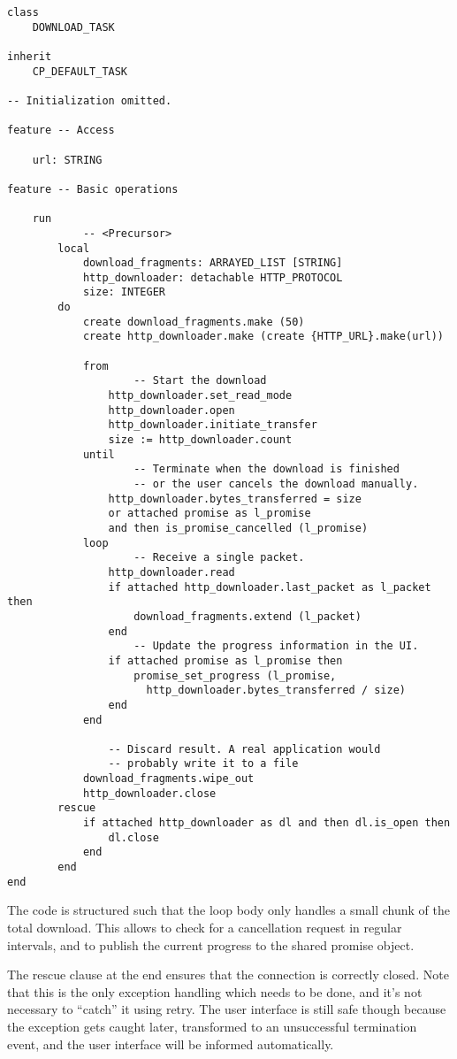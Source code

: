\begin{lstlisting}[language=OOSC2Eiffel, label={code:download-task}, captionpos=b, caption={The background download task.}]
class
	DOWNLOAD_TASK

inherit
	CP_DEFAULT_TASK

-- Initialization omitted.

feature -- Access

	url: STRING

feature -- Basic operations

	run
			-- <Precursor>
		local
			download_fragments: ARRAYED_LIST [STRING]
			http_downloader: detachable HTTP_PROTOCOL
			size: INTEGER
		do
			create download_fragments.make (50)
			create http_downloader.make (create {HTTP_URL}.make(url))

			from
					-- Start the download
				http_downloader.set_read_mode
				http_downloader.open
				http_downloader.initiate_transfer
				size := http_downloader.count
			until
					-- Terminate when the download is finished 
					-- or the user cancels the download manually.
				http_downloader.bytes_transferred = size 
				or attached promise as l_promise 
				and then is_promise_cancelled (l_promise)
			loop
					-- Receive a single packet.
				http_downloader.read
				if attached http_downloader.last_packet as l_packet then
					download_fragments.extend (l_packet)
				end
					-- Update the progress information in the UI.
				if attached promise as l_promise then
					promise_set_progress (l_promise, 
					  http_downloader.bytes_transferred / size)
				end
			end

				-- Discard result. A real application would
				-- probably write it to a file
			download_fragments.wipe_out
			http_downloader.close
		rescue
			if attached http_downloader as dl and then dl.is_open then
				dl.close
			end
		end
end
\end{lstlisting}

The code is structured such that the loop body only handles a small chunk of the total download.
This allows to check for a cancellation request in regular intervals, and to publish the current progress to the shared promise object.

The rescue clause at the end ensures that the connection is correctly closed.
Note that this is the only exception handling which needs to be done, and it's not necessary to ``catch'' it using retry.
The user interface is still safe though because the exception gets caught later, transformed to an unsuccessful termination event, and the user interface will be informed automatically.

